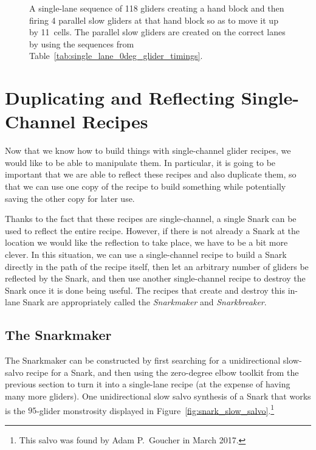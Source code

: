 \begin{figure}[!htb]
	\caption{A single-lane sequence of 118 gliders creating a hand block and then firing 4 parallel slow gliders at that hand block so as to move it up by 11~cells. The parallel slow gliders are created on the correct lanes by using the sequences from Table~\ref{tab:single_lane_0deg_glider_timings}.}\label{fig:0_degree_block_move}
\end{figure}


\section{Duplicating and Reflecting Single-Channel Recipes}\label{sec:snarkmaker}

Now that we know how to build things with single-channel glider recipes, we would like to be able to manipulate them. In particular, it is going to be important that we are able to reflect these recipes and also duplicate them, so that we can use one copy of the recipe to build something while potentially saving the other copy for later use.

Thanks to the fact that these recipes are single-channel, a single Snark can be used to reflect the entire recipe. However, if there is not already a Snark at the location we would like the reflection to take place, we have to be a bit more clever. In this situation, we can use a single-channel recipe to build a Snark directly in the path of the recipe itself, then let an arbitrary number of gliders be reflected by the Snark, and then use another single-channel recipe to destroy the Snark once it is done being useful. The recipes that create and destroy this in-lane Snark are appropriately called the \emph{Snarkmaker} and \emph{Snarkbreaker}.


\subsection{The Snarkmaker}\label{sec:snarkmaker_itself}

The Snarkmaker can be constructed by first searching for a unidirectional slow-salvo recipe for a Snark, and then using the zero-degree elbow toolkit from the previous section to turn it into a single-lane recipe (at the expense of having many more gliders). One unidirectional slow salvo synthesis of a Snark that works is the $95$-glider monstrosity displayed in Figure~\ref{fig:snark_slow_salvo}.\footnote{This salvo was found by Adam P.~Goucher in March 2017.}

